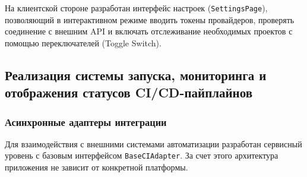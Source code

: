 \begin{table}[H]
    \centering
    \caption{Спецификация эндпоинтов управления (префикс \texttt{/api/v1})}
    \label{tab:api_endpoints}
    \small
\end{table}

На клиентской стороне разработан интерфейс настроек (\texttt{SettingsPage}), позволяющий в интерактивном режиме вводить токены провайдеров, проверять соединение с внешним API и включать отслеживание необходимых проектов с помощью переключателей (Toggle Switch).

\subsection{Реализация системы запуска, мониторинга и отображения статусов CI/CD-пайплайнов}

\subsubsection{Асинхронные адаптеры интеграции}
Для взаимодействия с внешними системами автоматизации разработан сервисный уровень с базовым интерфейсом \texttt{BaseCIAdapter}. За счет этого архитектура приложения не зависит от конкретной платформы.

